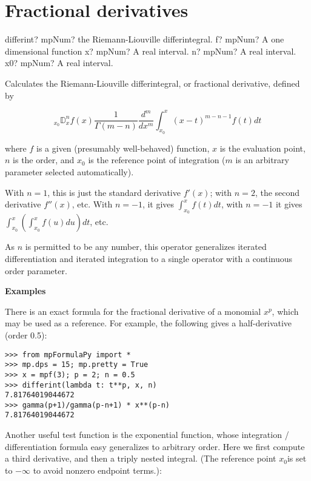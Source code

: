 \section{Fractional derivatives}


\begin{mpFunctionsExtract}
	\mpFunctionFour
	{differint? mpNum? the Riemann-Liouville differintegral.}
	{f? mpNum? A one dimensional function}
	{x? mpNum? A real interval.}	
	{n? mpNum? A real interval.}
	{x0? mpNum? A real interval.}				
\end{mpFunctionsExtract}

\vpara
Calculates the Riemann-Liouville differintegral, or fractional derivative, defined by

\begin{equation}
{}_{x_0}\mathbb{D}_x^n f(x) \frac{1}{\Gamma(m-n)} \frac{d^m}{dx^m} \int_{x_0}^{x} (x-t)^{m-n-1} f(t)dt
\end{equation}

where $f$ is a given (presumably well-behaved) function, $x$ is the evaluation point, $n$ is the order, and $x_0$ is the reference point of integration ($m$ is an arbitrary parameter selected automatically).

\vpara
With $n=1$, this is just the standard derivative $f'(x)$; with $n=2$, the second derivative $f''(x)$, etc. With $n=-1$, it gives $\int_{x_0}^x f(t)dt$, with $n=-1$ it gives $\int_{x_0}^x \left( \int_{x_0}^x f(u)du \right) dt$, etc.

\vpara
As $n$ is permitted to be any number, this operator generalizes iterated differentiation and iterated integration to a single operator with a continuous order parameter.

\vpara
\textbf{Examples}

There is an exact formula for the fractional derivative of a monomial $x^p$, which may be used as a reference. For example, the following gives a half-derivative (order 0.5):

\begin{lstlisting}
>>> from mpFormulaPy import *
>>> mp.dps = 15; mp.pretty = True
>>> x = mpf(3); p = 2; n = 0.5
>>> differint(lambda t: t**p, x, n)
7.81764019044672
>>> gamma(p+1)/gamma(p-n+1) * x**(p-n)
7.81764019044672
\end{lstlisting}

Another useful test function is the exponential function, whose integration / differentiation formula easy generalizes to arbitrary order. Here we first compute a third derivative, and then a triply nested integral. (The reference point $x_0$is set to $-\infty$ to avoid nonzero endpoint terms.):

